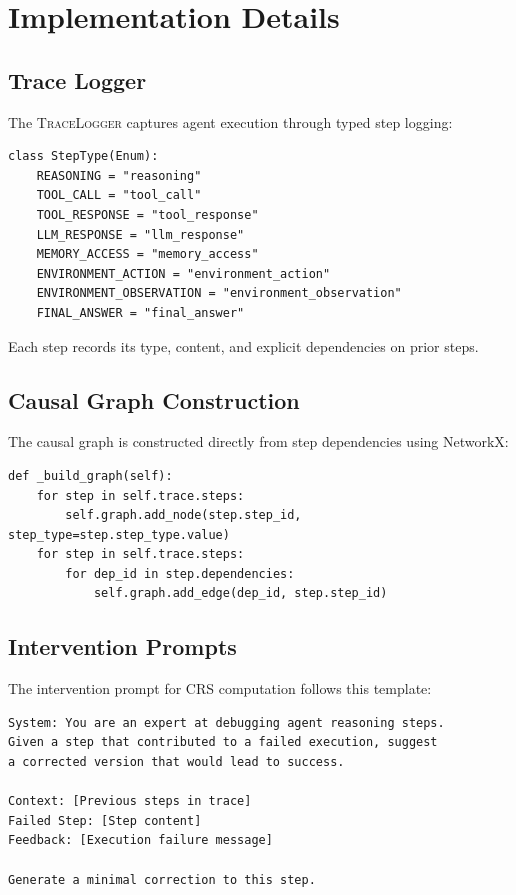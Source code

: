 \documentclass{article}
\theoremstyle{plain}
\theoremstyle{definition}
\theoremstyle{remark}
\begin{document}
\section{Implementation Details}

\subsection{Trace Logger}

The \textsc{TraceLogger} captures agent execution through typed step logging:

\begin{verbatim}
class StepType(Enum):
    REASONING = "reasoning"
    TOOL_CALL = "tool_call"
    TOOL_RESPONSE = "tool_response"
    LLM_RESPONSE = "llm_response"
    MEMORY_ACCESS = "memory_access"
    ENVIRONMENT_ACTION = "environment_action"
    ENVIRONMENT_OBSERVATION = "environment_observation"
    FINAL_ANSWER = "final_answer"
\end{verbatim}

Each step records its type, content, and explicit dependencies on prior steps.

\subsection{Causal Graph Construction}

The causal graph is constructed directly from step dependencies using NetworkX:

\begin{verbatim}
def _build_graph(self):
    for step in self.trace.steps:
        self.graph.add_node(step.step_id, step_type=step.step_type.value)
    for step in self.trace.steps:
        for dep_id in step.dependencies:
            self.graph.add_edge(dep_id, step.step_id)
\end{verbatim}

\subsection{Intervention Prompts}

The intervention prompt for CRS computation follows this template:

\begin{verbatim}
System: You are an expert at debugging agent reasoning steps.
Given a step that contributed to a failed execution, suggest
a corrected version that would lead to success.

Context: [Previous steps in trace]
Failed Step: [Step content]
Feedback: [Execution failure message]

Generate a minimal correction to this step.
\end{verbatim}
\end{document}
